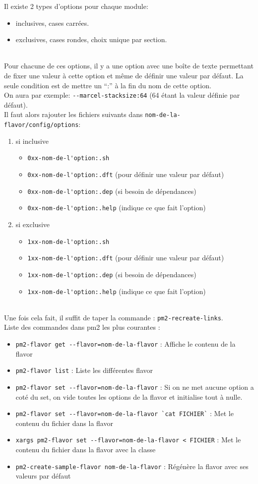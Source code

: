 \documentclass[11pt, a4paper ,twoside]{article}
\begin{document}
Il existe 2 types d'options pour chaque module:
\begin{itemize}
\item inclusives, cases carrées.
\item exclusives, cases rondes, choix unique par section.
\end{itemize}
~\\
 Pour chacune de ces options, il y a une option avec une boîte de texte permettant de fixer une valeur à cette option et même de définir une valeur par défaut.
La seule condition est de mettre un ``:'' à la fin du nom de cette option.
\\
On aura par exemple: \verb|--marcel-stacksize:64| (64 étant la valeur définie par défaut).
\\
Il faut alors rajouter les fichiers suivants dans \verb|nom-de-la-flavor/config/options|:
\begin{enumerate}
\item si inclusive
\begin{itemize}
\item \verb|0xx-nom-de-l'option:.sh|
\item \verb|0xx-nom-de-l'option:.dft| (pour définir une valeur par défaut)
\item \verb|0xx-nom-de-l'option:.dep| (si besoin de dépendances)
\item \verb|0xx-nom-de-l'option:.help| (indique ce que fait l'option)
\end{itemize}
\item si exclusive
\begin{itemize}
\item \verb|1xx-nom-de-l'option:.sh|
\item \verb|1xx-nom-de-l'option:.dft| (pour définir une valeur par défaut)
\item \verb|1xx-nom-de-l'option:.dep| (si besoin de dépendances)
\item \verb|1xx-nom-de-l'option:.help| (indique ce que fait l'option)
\end{itemize}
\end{enumerate}
~\\
Une fois cela fait, il suffit de taper la commande : \verb|pm2-recreate-links|.
~\\
Liste des commandes dans pm2 les plus courantes :
\begin{itemize}
\item \verb|pm2-flavor get --flavor=nom-de-la-flavor| : Affiche le contenu de la flavor
\item \verb|pm2-flavor list| : Liste les différentes flavor
\item \verb|pm2-flavor set --flavor=nom-de-la-flavor| : Si on ne met aucune option a coté du set, on vide toutes les options de la flavor et initialise tout à nulle.
\item \verb|pm2-flavor set --flavor=nom-de-la-flavor `cat FICHIER`| : Met le contenu du fichier dans la flavor
\item \verb|xargs pm2-flavor set --flavor=nom-de-la-flavor < FICHIER| : Met le contenu du fichier dans la flavor avec la classe
\item \verb|pm2-create-sample-flavor nom-de-la-flavor| : Régénère la flavor avec ses valeurs par défaut
\end{itemize}
\end{document}

